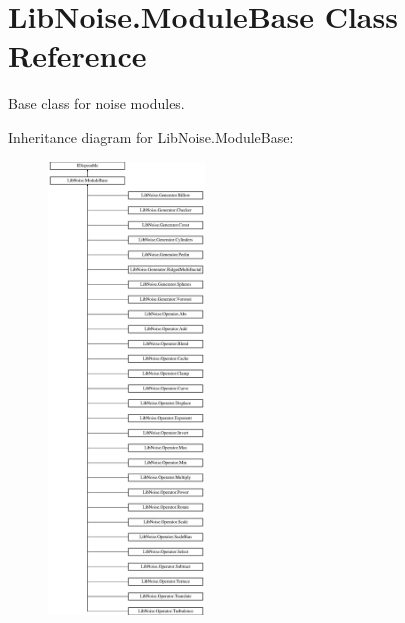 \hypertarget{class_lib_noise_1_1_module_base}{}\section{Lib\+Noise.\+Module\+Base Class Reference}
\label{class_lib_noise_1_1_module_base}


Base class for noise modules.  


Inheritance diagram for Lib\+Noise.\+Module\+Base\+:\begin{figure}[H]
\begin{center}
\leavevmode
\includegraphics[height=12.000000cm]{class_lib_noise_1_1_module_base}
\end{center}
\end{figure}
